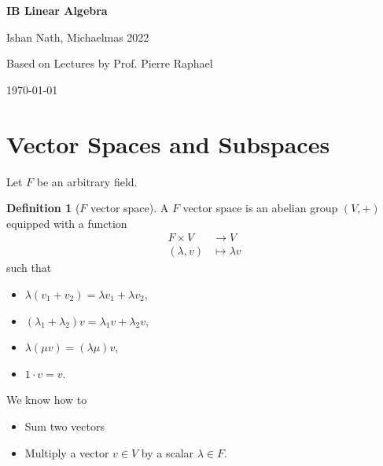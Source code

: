 \documentclass[12pt]{article}
\theoremstyle{definition}
\newtheorem{definition}{Definition}[section]
\theoremstyle{remark}
\begin{document}
\hypersetup{pageanchor=false}
\begin{titlepage}
	\begin{center}
		\vspace*{1em}
		\Huge
		\textbf{IB Linear Algebra}

		\vspace{1em}
		\large
		Ishan Nath, Michaelmas 2022

		\vspace{1.5em}

		\Large

		Based on Lectures by Prof. Pierre Raphael

		\vspace{1em}

		\large
		\today
	\end{center}
	
\end{titlepage}
\hypersetup{pageanchor=true}

\tableofcontents

\newpage

\section{Vector Spaces and Subspaces}%
\label{sec:vector_spaces_and_subspaces}

Let $F$ be an arbitrary field.

\begin{definition}[$F$ vector space]
	A $F$ vector space is an abelian group $(V, +)$ equipped with a function
	\begin{align*}
		F \times V &\to V \\
		(\lambda, v) &\mapsto \lambda v
	\end{align*}
	such that
	\begin{itemize}
		\item $\lambda(v_1 + v_2) = \lambda v_1 + \lambda v_2$, 
		\item $(\lambda_1 + \lambda_2)v = \lambda_1 v + \lambda_2 v$,
		\item $\lambda(\mu v) = (\lambda \mu) v$,
		\item $1 \cdot v = v$.
	\end{itemize}
\end{definition}
We know how to
\begin{itemize}
	\item Sum two vectors
	\item Multiply a vector $v \in V$ by a scalar $\lambda \in F$.
\end{itemize}
\end{document}
